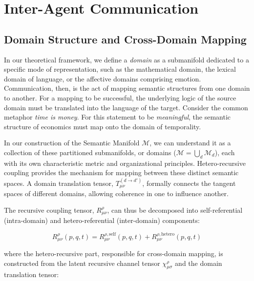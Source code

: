 \chapter{Inter-Agent Communication}
\label{14:inter_agent_communication}


\section{Domain Structure and Cross-Domain Mapping}
\label{14.1:domain_structure_and_cross_domain_mapping}

In our theoretical framework, we define a \textit{domain} as a submanifold dedicated to a specific mode of representation, such as the mathematical domain, the lexical domain of language, or the affective domains comprising emotion. Communication, then, is the act of mapping semantic structures from one domain to another. For a mapping to be successful, the underlying logic of the source domain must be translated into the language of the target. Consider the common metaphor \textit{time is money}. For this statement to be \textit{meaningful}, the semantic structure of economics must map onto the domain of temporality.

In our construction of the Semantic Manifold \(\mathcal{M}\), we can understand it as a collection of these partitioned submanifolds, or domains (\(\mathcal{M} = \bigcup_d \mathcal{M}_d\)), each with its own characteristic metric and organizational principles. Hetero-recursive coupling provides the mechanism for mapping between these distinct semantic spaces. A domain translation tensor, \(T_{\mu\nu}^{(d \to d')}\), formally connects the tangent spaces of different domains, allowing coherence in one to influence another.

The recursive coupling tensor, \(R^\rho_{\mu\nu}\), can thus be decomposed into self-referential (intra-domain) and hetero-referential (inter-domain) components:

\begin{equation}
R^\rho_{\mu\nu}(p, q, t) = R^{\rho, \text{self}}_{\mu\nu}(p, q, t) + R^{\rho, \text{hetero}}_{\mu\nu}(p, q, t)
\end{equation}

where the hetero-recursive part, responsible for cross-domain mapping, is constructed from the latent recursive channel tensor \(\chi^\rho_{\mu\sigma}\) and the domain translation tensor:

